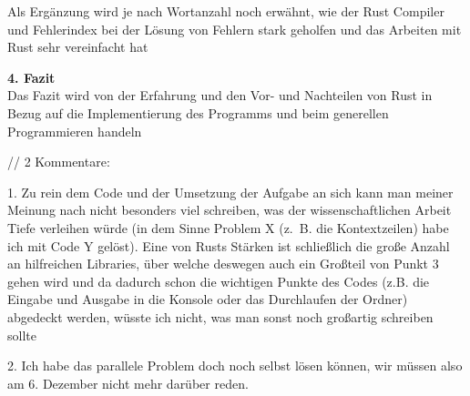\documentclass[
]{article}
\begin{document}
Als Ergänzung wird je nach Wortanzahl noch erwähnt, wie der Rust
Compiler und Fehlerindex bei der Lösung von Fehlern stark geholfen und
das Arbeiten mit Rust sehr vereinfacht hat~

\textbf{4. Fazit\\
}Das Fazit wird von der Erfahrung und den Vor- und Nachteilen von Rust
in Bezug auf die Implementierung des Programms und beim generellen
Programmieren handeln

// 2 Kommentare:

1. Zu rein dem Code und der Umsetzung der Aufgabe an sich kann man
meiner Meinung nach nicht besonders viel schreiben, was der
wissenschaftlichen Arbeit Tiefe verleihen würde (in dem Sinne Problem X
(z.~B. die Kontextzeilen) habe ich mit Code Y gelöst). Eine von Rusts
Stärken ist schließlich die große Anzahl an hilfreichen Libraries, über
welche deswegen auch ein Großteil von Punkt 3 gehen wird und da dadurch
schon die wichtigen Punkte des Codes (z.B. die Eingabe und Ausgabe in
die Konsole oder das Durchlaufen der Ordner) abgedeckt werden, wüsste
ich nicht, was man sonst noch großartig schreiben sollte

2. Ich habe das parallele Problem doch noch selbst lösen können, wir
müssen also am 6. Dezember nicht mehr darüber reden.
\end{document}
